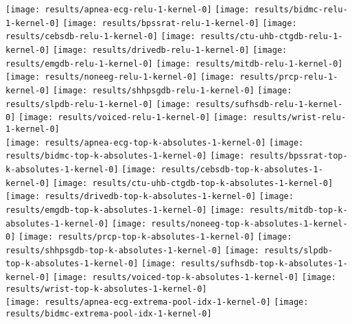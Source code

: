 \documentclass[journal]{IEEEtran}
\begin{document}
\begin{figure*}[!t]
	\centering
	\texttt{[image: results/apnea-ecg-relu-1-kernel-0]}
	\texttt{[image: results/bidmc-relu-1-kernel-0]}
	\texttt{[image: results/bpssrat-relu-1-kernel-0]}
	\texttt{[image: results/cebsdb-relu-1-kernel-0]}
	\texttt{[image: results/ctu-uhb-ctgdb-relu-1-kernel-0]}
	\texttt{[image: results/drivedb-relu-1-kernel-0]}
	\texttt{[image: results/emgdb-relu-1-kernel-0]}
	\texttt{[image: results/mitdb-relu-1-kernel-0]}
	\texttt{[image: results/noneeg-relu-1-kernel-0]}
	\texttt{[image: results/prcp-relu-1-kernel-0]}
	\texttt{[image: results/shhpsgdb-relu-1-kernel-0]}
	\texttt{[image: results/slpdb-relu-1-kernel-0]}
	\texttt{[image: results/sufhsdb-relu-1-kernel-0]}
	\texttt{[image: results/voiced-relu-1-kernel-0]}
	\texttt{[image: results/wrist-relu-1-kernel-0]}
	\\
	\texttt{[image: results/apnea-ecg-top-k-absolutes-1-kernel-0]}
	\texttt{[image: results/bidmc-top-k-absolutes-1-kernel-0]}
	\texttt{[image: results/bpssrat-top-k-absolutes-1-kernel-0]}
	\texttt{[image: results/cebsdb-top-k-absolutes-1-kernel-0]}
	\texttt{[image: results/ctu-uhb-ctgdb-top-k-absolutes-1-kernel-0]}
	\texttt{[image: results/drivedb-top-k-absolutes-1-kernel-0]}
	\texttt{[image: results/emgdb-top-k-absolutes-1-kernel-0]}
	\texttt{[image: results/mitdb-top-k-absolutes-1-kernel-0]}
	\texttt{[image: results/noneeg-top-k-absolutes-1-kernel-0]}
	\texttt{[image: results/prcp-top-k-absolutes-1-kernel-0]}
	\texttt{[image: results/shhpsgdb-top-k-absolutes-1-kernel-0]}
	\texttt{[image: results/slpdb-top-k-absolutes-1-kernel-0]}
	\texttt{[image: results/sufhsdb-top-k-absolutes-1-kernel-0]}
	\texttt{[image: results/voiced-top-k-absolutes-1-kernel-0]}
	\texttt{[image: results/wrist-top-k-absolutes-1-kernel-0]}
	\\
	\texttt{[image: results/apnea-ecg-extrema-pool-idx-1-kernel-0]}
	\texttt{[image: results/bidmc-extrema-pool-idx-1-kernel-0]}

\end{figure*}
\end{document}
